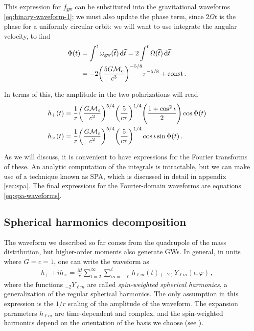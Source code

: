 \documentclass[main.tex]{subfiles}
\begin{document}

This expression for \(f _{\text{gw}}\) can be substituted into the gravitational waveforms \eqref{eq:binary-waveform-1}; we must also update the phase term, since \(2 \Omega t\) is the phase for a uniformly circular orbit: we will want to use integrate the angular velocity, to find 
%
\begin{align} \label{eq:phase-quadrupole-emission}
\Phi (t) &= \int^{t} \omega _{\text{gw}}(\widetilde{t}) \dd{\widetilde{t}} = 2 \int^{t} \Omega (\widetilde{t}) \dd{\widetilde{t}}  \\
&= -2 \qty(\frac{5 G \mathcal{M}_c}{c^3})^{-5/8} \tau^{-5/8} + \mathrm{const}
\,.
\end{align}

In terms of this, the amplitude in the two polarizations will read \cite[eqs.\ 4.31--32]{maggioreGravitationalWavesVolume2007}
%
\begin{align} \label{eq:amplitude-quadrupole-emission}
h_{+} (t) &= \frac{1}{r} \qty(\frac{G \mathcal{M}_c}{c^2})^{5/4} \qty( \frac{5}{c \tau })^{1/4} \qty(\frac{1 + \cos^2\iota }{2}) \cos \Phi (t) \\
h_{ \times } (t) &= \frac{1}{r} \qty(\frac{G \mathcal{M}_c}{c^2})^{5/4} \qty( \frac{5}{c \tau })^{1/4} \cos \iota  \sin \Phi (t) 
\,.
\end{align}

As we will discuss, it is convenient to have expressions for the Fourier transforms of these. An analytic computation of the integrals is intractable, but we can make use of a technique known as \ac{SPA}, which is discussed in detail in appendix \ref{sec:spa}. 
The final expressions for the Fourier-domain waveforms are equations \eqref{eq:spa-waveforms}. 

\subsection{Spherical harmonics decomposition} \label{sec:spherical-harmonics-decomposition}

The waveform we described so far comes from the quadrupole of the mass distribution, but higher-order moments also generate \acp{GW}.
In general, in units where \(G = c = 1\), one can write the waveform as \cite[eq.\ II.6]{ajithDataFormatsNumerical2011}
%
\begin{align}
h_+ + i h_\times = \frac{M}{r} \sum _{l=2}^{\infty } \sum _{m=-\ell}^{\ell} h_{\ell m} (t) {}_{(-2)}Y_{\ell m} (\iota, \varphi )
\,,
\end{align}
%
where the functions \({}_{-2}Y_{\ell m}\) are called \emph{spin-weighted spherical harmonics}, a generalization of the regular spherical harmonics. 
The only assumption in this expression is the \(1/r\) scaling of the amplitude of the waveform. 
The expansion parameters \(h_{\ell m}\) are time-dependent and complex, and the spin-weighted harmonics depend on the orientation of the basis we choose (see ).
\end{document}
